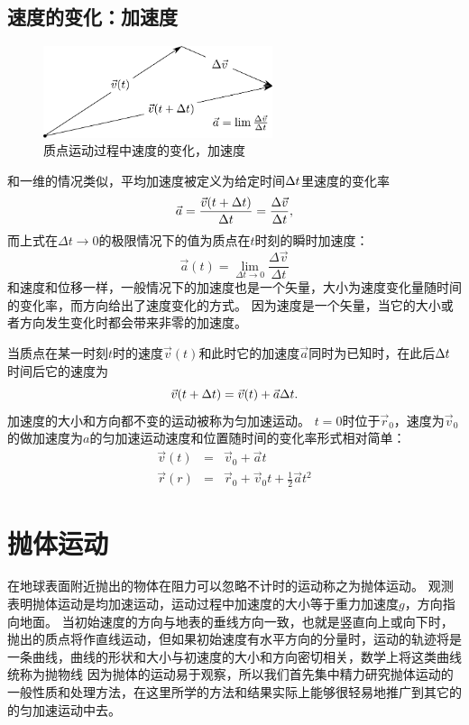 \subsection{速度的变化：加速度}
\begin{figure}[hbtp]
\centering
\includegraphics[width=0.6\textwidth]{images/motion-theory-7.pdf}
\caption{质点运动过程中速度的变化，加速度}
\end{figure}

和一维的情况类似，平均加速度被定义为给定时间$\Delta t$里速度的变化率
\begin{equation}
\vec{a} = \frac{\vec{v}(t+\Delta t)}{\Delta t}=\frac{\Delta \vec{v}}{\Delta t},
\end{equation}
而上式在$\Delta t\rightarrow 0$的极限情况下的值为质点在$t$时刻的瞬时加速度：
\begin{equation}
\vec{a}(t) = \lim_{\Delta t\rightarrow 0}\frac{\Delta\vec{v}}{\Delta t}
\end{equation}
和速度和位移一样，一般情况下的加速度也是一个矢量，大小为速度变化量随时间的变化率，而方向给出了速度变化的方式。
因为速度是一个矢量，当它的大小或者方向发生变化时都会带来非零的加速度。




当质点在某一时刻$t$时的速度$\vec{v}(t)$和此时它的加速度$\vec{a}$同时为已知时，在此后$\Delta t$时间后它的速度为
\begin{equation}
\vec{v}(t+\Delta t) = \vec{v}(t)+\vec{a}\Delta t.
\end{equation}
加速度的大小和方向都不变的运动被称为{\heiti 匀加速运动}。
$t=0$时位于$\vec{r}_0$，速度为$\vec{v}_0$的做加速度为$a$的匀加速运动速度和位置随时间的变化率形式相对简单：
\begin{eqnarray}
\vec{v}(t) &=& \vec{v}_0+\vec{a}t\\
\vec{r}(r)&=&\vec{r}_0+\vec{v}_0t+\frac{1}{2}\vec{a}t^2
\end{eqnarray}



\section{抛体运动}
在地球表面附近抛出的物体在阻力可以忽略不计时的运动称之为抛体运动。
观测表明抛体运动是均加速运动，运动过程中加速度的大小等于重力加速度$g$，方向指向地面。
当初始速度的方向与地表的垂线方向一致，也就是竖直向上或向下时，抛出的质点将作直线运动，但如果初始速度有水平方向的分量时，运动的轨迹将是一条曲线，曲线的形状和大小与初速度的大小和方向密切相关，数学上将这类曲线统称为{\heiti 抛物线}
因为抛体的运动易于观察，所以我们首先集中精力研究抛体运动的一般性质和处理方法，在这里所学的方法和结果实际上能够很轻易地推广到其它的的匀加速运动中去。

